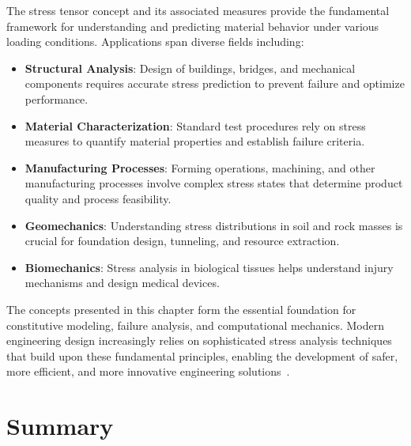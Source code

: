 The stress tensor concept and its associated measures provide the fundamental framework for understanding and predicting material behavior under various loading conditions. Applications span diverse fields including:

\begin{itemize}
\item \textbf{Structural Analysis}: Design of buildings, bridges, and mechanical components requires accurate stress prediction to prevent failure and optimize performance.
\item \textbf{Material Characterization}: Standard test procedures rely on stress measures to quantify material properties and establish failure criteria.
\item \textbf{Manufacturing Processes}: Forming operations, machining, and other manufacturing processes involve complex stress states that determine product quality and process feasibility.
\item \textbf{Geomechanics}: Understanding stress distributions in soil and rock masses is crucial for foundation design, tunneling, and resource extraction.
\item \textbf{Biomechanics}: Stress analysis in biological tissues helps understand injury mechanisms and design medical devices.
\end{itemize}

The concepts presented in this chapter form the essential foundation for constitutive modeling, failure analysis, and computational mechanics. Modern engineering design increasingly relies on sophisticated stress analysis techniques that build upon these fundamental principles, enabling the development of safer, more efficient, and more innovative engineering solutions~\autocite{Sadd.2019}.

\section{Summary}

